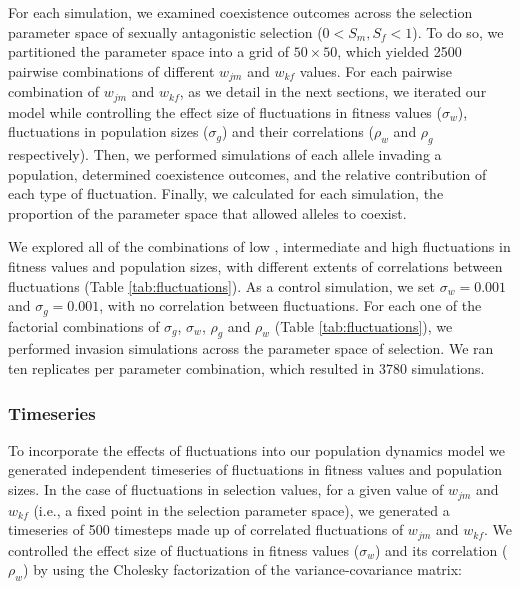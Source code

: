 \documentclass[12pt]{article}
\begin{document}


For each simulation, we examined coexistence outcomes across the selection parameter space of sexually antagonistic selection ($0 < S_{m}, S_{f} < 1$). To do so, we partitioned the parameter space into a grid of $50 \times 50$, which yielded 2500 pairwise combinations of different $w_{jm}$ and $w_{kf}$ values. For each pairwise combination of $w_{jm}$ and $w_{kf}$, as we detail in the next sections, we iterated our model while controlling the effect size of  fluctuations in fitness values ($\sigma_{w}$), fluctuations in population sizes ($\sigma_{g}$) and their correlations ($\rho_{w}$ and $\rho_{g}$ respectively). Then, we performed simulations of each allele invading a population, determined coexistence outcomes, and the relative contribution of each type of fluctuation. Finally, we calculated for each simulation, the proportion of the parameter space that allowed alleles to coexist.

We explored all of  the combinations of low , intermediate  and high fluctuations  in fitness values and population sizes, with different extents of correlations between fluctuations (Table \ref{tab:fluctuations}).  As a control simulation, we set $\sigma_{w}= 0.001$ and  $\sigma_{g}=0.001$, with no correlation between fluctuations. For each one of the factorial combinations of $\sigma_{g}$, $\sigma_{w}$, $\rho_{g}$ and $\rho_{w}$ (Table \ref{tab:fluctuations}), we performed invasion simulations across the parameter space of selection. We ran ten replicates per parameter combination, which resulted in 3780 simulations.

\subsubsection*{Timeseries}


To incorporate the effects of fluctuations into our population dynamics model we generated independent timeseries of fluctuations in fitness values and population sizes. In the case of fluctuations in selection values, for a given value of $w_{jm}$ and $w_{kf}$ (i.e., a fixed point in the selection parameter space), we generated a timeseries of 500 timesteps made up of correlated fluctuations of $w_{jm}$ and $w_{kf}$. We controlled the effect size of  fluctuations in fitness values ($\sigma_{w}$) and its correlation ($\rho_{w}$) by  using the Cholesky factorization of the variance-covariance matrix:
\end{document}
